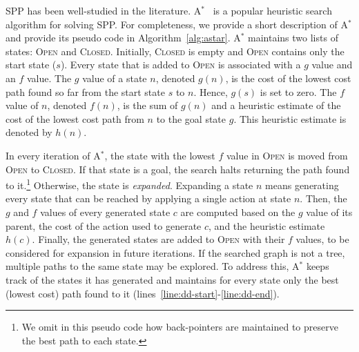\documentclass{aicom2e}
\newcommand{\astar}{A$^*$}
\newcommand{\open}{\textsc{Open}}
\newcommand{\closed}{\textsc{Closed}}
\newcommand{\roni}[1]{\textbf{[RS:#1]}}
\begin{document}
SPP has been well-studied in the literature. \astar{}~\cite{hartNR68Astar} is a popular
 heuristic search algorithm for solving SPP. For completeness, we provide a short description of \astar{} 
 and provide its pseudo code in Algorithm~\ref{alg:astar}. \astar{} maintains two lists of states: \open{} and
\closed{}. Initially, \closed{} is empty and \open{} contains only the start
state ($s$). Every state that is added to \open{} is associated with a $g$
value and an $f$ value. The $g$ value of a state $n$, denoted $g(n)$, is the
cost of the lowest cost path found so far from the start state $s$ to $n$.
Hence, $g(s)$ is set to zero. 
The $f$ value of $n$, denoted $f(n)$, is the sum
of $g(n)$ and a heuristic estimate of the cost of the lowest cost
path from $n$ to the goal state $g$. This heuristic estimate is denoted
by $h(n)$. %


In every iteration of \astar{}, the state with the lowest $f$ value in \open{}
is moved from \open{} to \closed{}. If that state is a goal, the search halts
returning the path found to it.\footnote{We omit in this pseudo code how
back-pointers are maintained to  preserve the best path to each state.}
Otherwise, the state is {\em expanded}. Expanding a state $n$ means generating
every state that can be reached by applying a single action at state $n$. Then,
the $g$ and $f$ values of every generated state $c$ are computed based on the
$g$ value of its parent, the cost of the action used to generate $c$, and the
heuristic estimate $h(c)$. Finally, the generated states are added to \open{}
with their $f$ values, to be considered for expansion in future iterations. If
the searched graph is not a tree, multiple paths to the same state may be
explored. To address this, \astar{} keeps track of the states it has generated 
and maintains for every state only the best (lowest cost) path found to it (lines~\ref{line:dd-start}-\ref{line:dd-end}).








\end{document}
